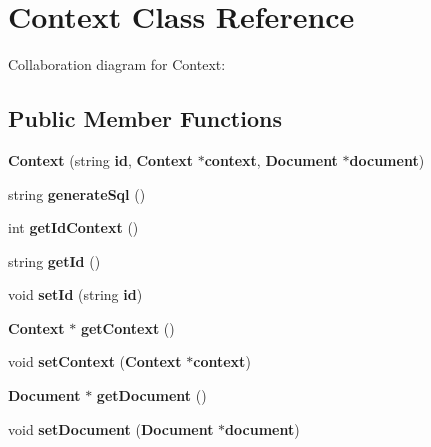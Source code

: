 \section{Context Class Reference}
\label{classbr_1_1ufscar_1_1lince_1_1ginga_1_1recommender_1_1Context}
Collaboration diagram for Context:\subsection*{Public Member Functions}
\begin{CompactItemize}
\item 
\textbf{Context} (string {\bf id}, {\bf Context} $\ast${\bf context}, {\bf Document} $\ast${\bf document})\label{classbr_1_1ufscar_1_1lince_1_1ginga_1_1recommender_1_1Context_17e024ab8b0d65f7a4236462e063dff3}

\item 
string \textbf{generateSql} ()\label{classbr_1_1ufscar_1_1lince_1_1ginga_1_1recommender_1_1Context_8f1e45f781da9a5727416350efd7d586}

\item 
int \textbf{getIdContext} ()\label{classbr_1_1ufscar_1_1lince_1_1ginga_1_1recommender_1_1Context_bb5aa7ed037b47af3591b2cd38ac9b01}

\item 
string \textbf{getId} ()\label{classbr_1_1ufscar_1_1lince_1_1ginga_1_1recommender_1_1Context_bba5652b12c4d6161f860eb44d5789d8}

\item 
void \textbf{setId} (string {\bf id})\label{classbr_1_1ufscar_1_1lince_1_1ginga_1_1recommender_1_1Context_09363425ca175437f0ec328d404ab88a}

\item 
{\bf Context} $\ast$ \textbf{getContext} ()\label{classbr_1_1ufscar_1_1lince_1_1ginga_1_1recommender_1_1Context_55db892dd93d80828064fc266e953172}

\item 
void \textbf{setContext} ({\bf Context} $\ast${\bf context})\label{classbr_1_1ufscar_1_1lince_1_1ginga_1_1recommender_1_1Context_0ca636f9ea054270a55bb577d2c939c4}

\item 
{\bf Document} $\ast$ \textbf{getDocument} ()\label{classbr_1_1ufscar_1_1lince_1_1ginga_1_1recommender_1_1Context_3f65f50a478ba7b5b81d819b16b5f01c}

\item 
void \textbf{setDocument} ({\bf Document} $\ast${\bf document})\label{classbr_1_1ufscar_1_1lince_1_1ginga_1_1recommender_1_1Context_406b1aca372659ab6eab4b0182c98a45}

\end{CompactItemize}

